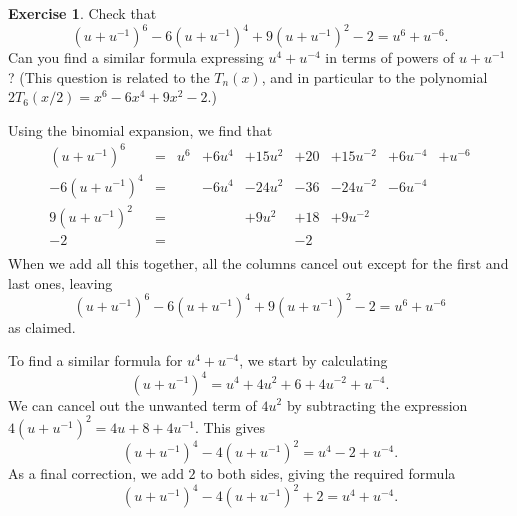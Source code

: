 \documentclass[a4paper]{book}
\theoremstyle{definition}
\newtheorem{exercise}[theorem]{Exercise}
\renewenvironment{solution}{\SolutionInline}{\endSolutionInline}
\begin{document}
\begin{exercise}
 Check that
 \[ (u+u^{-1})^6 - 6(u+u^{-1})^4 + 9(u+u^{-1})^2 - 2 =
      u^6 + u^{-6}.
 \]
 Can you find a similar formula expressing $u^4+u^{-4}$ in terms of
 powers of $u+u^{-1}$?  (This question is related to the
  $T_n(x)$, and in
 particular to the polynomial $2T_6(x/2)=x^6-6x^4+9x^2-2$.)
\end{exercise}
\begin{solution}
 Using the binomial expansion, we find that
 \[ \begin{array}{rclllllll}
  (u+u^{-1})^6  &=& u^6& +6u^4& +15u^2& +20& +15u^{-2}& +6u^{-4}& +u^{-6}\\
  -6(u+u^{-1})^4&=&    & -6u^4& -24u^2& -36& -24u^{-2}& -6u^{-4}& \\
  9(u+u^{-1})^2 &=&    &      &  +9u^2& +18& +9u^{-2} &         & \\
  -2            &=&    &      &       & -2 &          &         & \\
 \end{array} \]
 When we add all this together, all the columns cancel out except for
 the first and last ones, leaving
 \[ (u+u^{-1})^6 - 6(u+u^{-1})^4 + 9(u+u^{-1})^2 - 2 =
      u^6 + u^{-6}
 \]
 as claimed.

 To find a similar formula for $u^4+u^{-4}$, we start by calculating
 \[ (u+u^{-1})^4 = u^4 + 4u^2 + 6 + 4u^{-2} + u^{-4}. \]
 We can cancel out the unwanted term of $4u^2$ by subtracting the
 expression $4(u+u^{-1})^2=4u+8+4u^{-1}$.  This gives
 \[ (u+u^{-1})^4 - 4(u+u^{-1})^2 = u^4 -2 + u^{-4}. \]
 As a final correction, we add $2$ to both sides, giving the required
 formula
 \[ (u+u^{-1})^4 - 4(u+u^{-1})^2 + 2 = u^4 + u^{-4}. \]
\end{solution}
\end{document}
